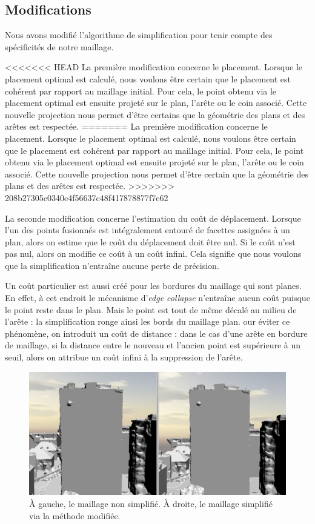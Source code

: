 ﻿\documentclass[12pt, twoside]{article}
\begin{document}
\subsection{Modifications}
Nous avons modifié l'algorithme de simplification pour tenir compte des spécificités de notre maillage.

<<<<<<< HEAD
La première modification concerne le placement. Lorsque le placement optimal est calculé, nous voulons être certain que le placement est cohérent par rapport au maillage initial. Pour cela, le point obtenu via le placement optimal est ensuite projeté sur le plan, l'arête ou le coin associé. Cette nouvelle projection nous permet d'être certains que la géométrie des plans et des arêtes est respectée.
=======
La première modification concerne le placement. Lorsque le placement optimal est calculé, nous voulons être certain que le placement est cohérent par rapport au maillage initial. Pour cela, le point obtenu via le placement optimal est ensuite projeté sur le plan, l'arête ou le coin associé. Cette nouvelle projection nous permet d'être certain que la géométrie des plans et des arêtes est respectée.
>>>>>>> 208b27305c0340e4f56637c48f417878877f7e62

La seconde modification concerne l'estimation du coût de déplacement. Lorsque l'un des points fusionnés est intégralement entouré de facettes assignées à un plan, alors on estime que le coût du déplacement doit être nul. Si le coût n'est pas nul, alors on modifie ce coût à un coût infini. Cela signifie que nous voulons que la simplification n'entraîne aucune perte de précision.

Un coût particulier est aussi créé pour les bordures du maillage qui sont planes. En effet, à cet endroit le mécanisme d'\textit{edge collapse} n'entraîne aucun coût puisque le point reste dans le plan. Mais le point est tout de même décalé au milieu de l'arête : la simplification ronge ainsi les bords du maillage plan. our éviter ce phénomène, on introduit un coût de distance : dans le cas d'une arête en bordure de maillage, si la distance entre le nouveau et l'ancien point est supérieure à un seuil, alors on attribue un coût infini à la suppression de l'arête.

\begin{figure}[h]
\centering
\includegraphics[scale=0.33]{Simpli2.png}
\caption{\label{fig:simpl2} À gauche, le maillage non simplifié. À droite, le maillage simplifié via la méthode modifiée.}
\end{figure}
\end{document}
